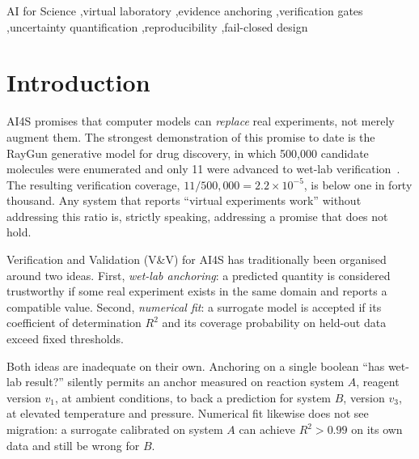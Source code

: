\documentclass[review,3p]{elsarticle}
\begin{document}
\begin{frontmatter}
\begin{abstract}
verification, coverage $2.2\times10^{-5}$), TDEA converts the anchoring layer from an \emph{evidence log} into an \emph{evidence constraint}, so that in-silico predictions are only trusted when the anchor matches the target scenario on all three dimensions.
\end{abstract}

\begin{keyword}
AI for Science \sep virtual laboratory \sep evidence anchoring \sep verification gates \sep uncertainty quantification \sep reproducibility \sep fail-closed design
\end{keyword}

\end{frontmatter}

\section{Introduction}
\label{sec:intro}

AI4S promises that computer models can \emph{replace} real experiments, not merely augment them. The strongest demonstration of this promise to date is the RayGun generative model for drug discovery, in which 500{,}000 candidate molecules were enumerated and only 11 were advanced to wet-lab verification~\cite{raygun2026nature}. The resulting verification coverage, $11/500{,}000 = 2.2\times 10^{-5}$, is below one in forty thousand. Any system that reports ``virtual experiments work'' without addressing this ratio is, strictly speaking, addressing a promise that does not hold.

Verification and Validation (V\&V) for AI4S has traditionally been organised around two ideas. First, \emph{wet-lab anchoring}: a predicted quantity is considered trustworthy if some real experiment exists in the same domain and reports a compatible value. Second, \emph{numerical fit}: a surrogate model is accepted if its coefficient of determination $R^2$ and its coverage probability on held-out data exceed fixed thresholds.

Both ideas are inadequate on their own. Anchoring on a single boolean ``has wet-lab result?'' silently permits an anchor measured on reaction system $A$, reagent version $v_1$, at ambient conditions, to back a prediction for system $B$, version $v_3$, at elevated temperature and pressure. Numerical fit likewise does not see migration: a surrogate calibrated on system $A$ can achieve $R^2 > 0.99$ on its own data and still be wrong for $B$.
\end{document}
